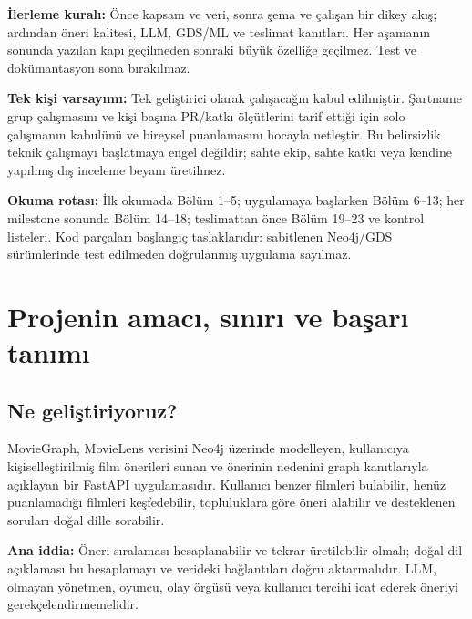 \documentclass[11pt,a4paper]{article}
\begin{document}
\textbf{İlerleme kuralı:} Önce kapsam ve veri, sonra şema ve çalışan bir dikey akış; ardından öneri kalitesi, LLM, GDS/ML ve teslimat kanıtları. Her aşamanın sonunda yazılan kapı geçilmeden sonraki büyük özelliğe geçilmez. Test ve dokümantasyon sona bırakılmaz.

\textbf{Tek kişi varsayımı:} Tek geliştirici olarak çalışacağın kabul edilmiştir. Şartname grup çalışmasını ve kişi başına PR/katkı ölçütlerini tarif ettiği için solo çalışmanın kabulünü ve bireysel puanlamasını hocayla netleştir. Bu belirsizlik teknik çalışmayı başlatmaya engel değildir; sahte ekip, sahte katkı veya kendine yapılmış dış inceleme beyanı üretilmez.

\textbf{Okuma rotası:} İlk okumada Bölüm 1--5; uygulamaya başlarken Bölüm 6--13; her milestone sonunda Bölüm 14--18; teslimattan önce Bölüm 19--23 ve kontrol listeleri. Kod parçaları başlangıç taslaklarıdır: sabitlenen Neo4j/GDS sürümlerinde test edilmeden doğrulanmış uygulama sayılmaz.

\tableofcontents
\clearpage
\section{Projenin amacı, sınırı ve başarı tanımı}
\subsection{Ne geliştiriyoruz?}
MovieGraph, MovieLens verisini Neo4j üzerinde modelleyen, kullanıcıya kişiselleştirilmiş film önerileri sunan ve önerinin nedenini graph kanıtlarıyla açıklayan bir FastAPI uygulamasıdır. Kullanıcı benzer filmleri bulabilir, henüz puanlamadığı filmleri keşfedebilir, topluluklara göre öneri alabilir ve desteklenen soruları doğal dille sorabilir.

\textbf{Ana iddia:} Öneri sıralaması hesaplanabilir ve tekrar üretilebilir olmalı; doğal dil açıklaması bu hesaplamayı ve verideki bağlantıları doğru aktarmalıdır. LLM, olmayan yönetmen, oyuncu, olay örgüsü veya kullanıcı tercihi icat ederek öneriyi gerekçelendirmemelidir.
\end{document}
